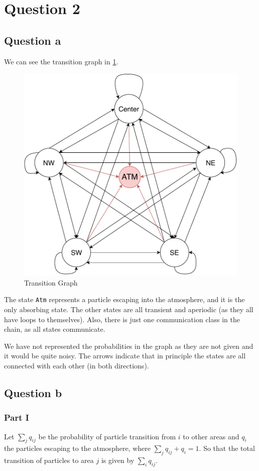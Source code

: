 \documentclass[11pt, a4paper]{article}
\begin{document}
\section{Question 2}
\subsection{Question a}
We can see the transition graph in \cref{fig:trans-graph}.
\begin{figure}[H]
	\centering
	\includegraphics[scale = .7]{figures/transition-graph.pdf}
	\caption{Transition Graph}
	\label{fig:trans-graph}
\end{figure}
The state \verb|Atm| represents a particle escaping into the atmosphere, and it is the only absorbing state. The other states are all transient and aperiodic (as they all have loops to themselves). Also, there is just one communication class in the chain, as all states communicate.

We have not represented the probabilities in the graph as they are not given and it would be quite noisy. The arrows indicate that in principle the states are all connected with each other (in both directions).

\subsection{Question b}
\subsubsection*{Part I}
Let  $\sum_j q_{ij} $ be the probability of particle transition from $i$ to other areas and $q_i$ the particles escaping to the atmosphere, where $\sum_j q_{ij} + q_i = 1$.  So that the total transition of particles to area $j$ is given by $\sum_i q_{ij}$. 
\end{document}
